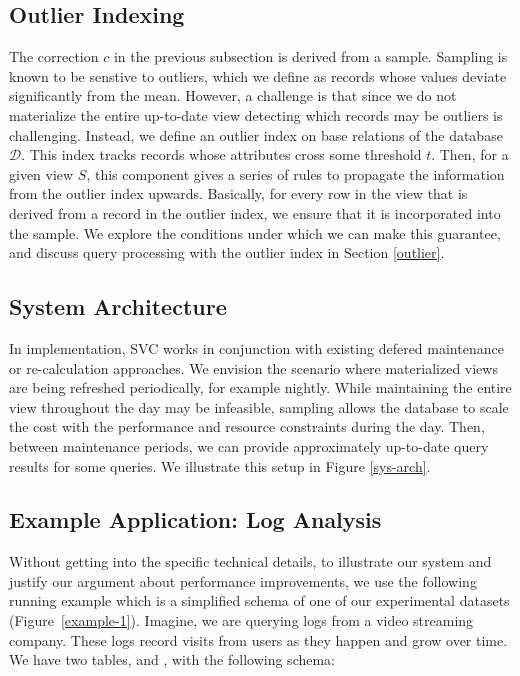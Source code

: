 \subsection{Outlier Indexing}
The correction $c$ in the previous subsection is derived from a sample.
Sampling is known to be senstive to outliers, which we define as records whose values deviate significantly from the mean.
However, a challenge is that since we do not materialize the entire up-to-date view detecting which records may be outliers is challenging.
Instead, we define an outlier index on base relations of the database $\mathcal{D}$.
This index tracks records whose attributes cross some threshold $t$.
Then, for a given view $S$, this component gives a series of rules to propagate the information from the outlier index upwards.
Basically, for every row in the view that is derived from a record in the outlier index, we ensure that it is incorporated into the sample.
We explore the conditions under which we can make this guarantee, and discuss query processing with the outlier index in Section \ref{outlier}.

\subsection{System Architecture}
In implementation, SVC works in conjunction with existing defered maintenance or re-calculation approaches.
We envision the scenario where materialized views are being refreshed periodically, for example nightly.
While maintaining the entire view throughout the day may be infeasible, sampling allows the database to scale the cost with the performance and resource constraints during the day.
Then, between maintenance periods, we can provide approximately up-to-date query results for some queries.
We illustrate this setup in Figure \ref{sys-arch}.

\subsection{Example Application: Log Analysis}
Without getting into the specific technical details, to illustrate our system and justify our argument about performance improvements, we use the following running example which is a 
simplified schema of one of our experimental datasets (Figure~\ref{example-1}).
Imagine, we are querying logs from a video streaming company. 
These logs record visits from users as they happen and grow over time.
We have two tables,  and , with the following schema:

